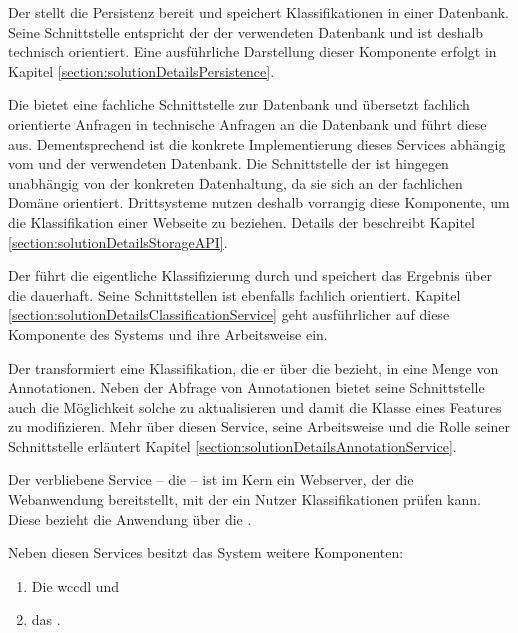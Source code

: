         Der {\classificationStorage} stellt die Persistenz bereit und speichert
        Klassifikationen in einer Datenbank.
        Seine Schnittstelle entspricht der der verwendeten Datenbank und ist deshalb
        technisch orientiert.
        Eine ausführliche Darstellung dieser Komponente erfolgt in
        Kapitel \ref{section:solutionDetailsPersistence}.

        Die {\classificationStorageAPI} bietet eine fachliche Schnittstelle zur Datenbank
        und übersetzt fachlich orientierte Anfragen in technische Anfragen an die Datenbank und führt diese aus.
        Dementsprechend ist die konkrete Implementierung dieses Services abhängig vom {\classificationStorage}
        und der verwendeten Datenbank.
        Die Schnittstelle der {\classificationStorageAPI}
        ist hingegen unabhängig von der konkreten Datenhaltung,
        da sie sich an der fachlichen Domäne orientiert.
        Drittsysteme nutzen deshalb vorrangig diese Komponente, um die Klassifikation einer Webseite zu beziehen.
        Details der {\classificationStorageAPI} beschreibt Kapitel \ref{section:solutionDetailsStorageAPI}.

        Der {\classificationService} führt die eigentliche Klassifizierung durch
        und speichert das Ergebnis über die {\classificationStorageAPI} dauerhaft.
        Seine Schnittstellen ist ebenfalls fachlich orientiert.
        Kapitel \ref{section:solutionDetailsClassificationService} geht ausführlicher auf diese Komponente
        des Systems und ihre Arbeitsweise ein.

        Der {\annotationService} transformiert eine Klassifikation,
        die er über die {\classificationStorageAPI} bezieht,
        in eine Menge von Annotationen.
        Neben der Abfrage von Annotationen bietet seine Schnittstelle auch
        die Möglichkeit solche zu aktualisieren und damit die Klasse eines Features zu modifizieren.
        Mehr über diesen Service, seine Arbeitsweise und die Rolle seiner Schnittstelle
        erläutert Kapitel \ref{section:solutionDetailsAnnotationService}.

        Der verbliebene Service -- die {\webAppService} -- ist im Kern ein Webserver,
        der die Webanwendung bereitstellt,
        mit der ein Nutzer Klassifikationen prüfen kann.
        Diese bezieht die Anwendung über die {\classificationStorageAPI}.

        Neben diesen Services besitzt das System weitere Komponenten:

        \begin{enumerate}
            \item Die \gls{wccdl} und
            \item das {\annotatorPlugin}.
        \end{enumerate}

